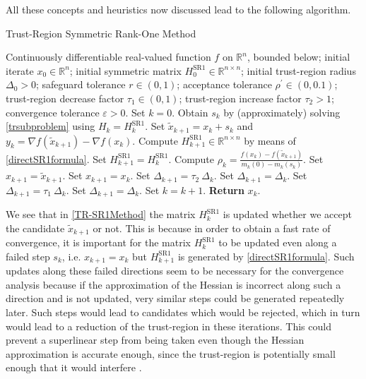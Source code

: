 All these concepts and heuristics now discussed lead to the following algorithm.
\begin{algorithm}[H]
    \caption{Trust-Region Symmetric Rank-One Method}\label{TR-SR1Method}
    \begin{algorithmic}[1]
        \State Continuously differentiable real-valued function $f$ on $\mathbb{R}^n$, bounded below; initial iterate $x_0 \in \mathbb{R}^n$; initial symmetric matrix $H^{\mathrm{SR1}}_0 \in \mathbb{R}^{n \times n}$; initial trust-region radius $\Delta_0 > 0$; safeguard tolerance $r \in (0,1)$; acceptance tolerance $\rho^{\prime} \in (0, 0.1)$; trust-region decrease factor $\tau_1 \in (0,1)$; trust-region increase factor $\tau_2 > 1$; convergence tolerance $\varepsilon > 0$. Set $k = 0$.
            \State Obtain $s_k$ by (approximately) solving \cref{trsubproblem} using $H_k = H^{\mathrm{SR1}}_k$.
            \State Set $\widetilde{x}_{k+1} = x_k + s_k$ and $y_k = \nabla f(\widetilde{x}_{k+1}) - \nabla f(x_k)$.
                \State Compute $H^{\mathrm{SR1}}_{k+1} \in \mathbb{R}^{n \times n}$ by means of \cref{directSR1formula}. 
			\Else 
				\State Set $H^{\mathrm{SR1}}_{k+1} = H^{\mathrm{SR1}}_k$.
            \EndIf 
            \State Compute $\rho_k = \frac{f(x_k) - f(\widetilde{x}_{k+1})}{m_k(0) - m_k(s_k)}$.
                \State Set $x_{k+1} = \widetilde{x}_{k+1}$.
			\Else 
				\State Set $x_{k+1} = x_k$.
            \EndIf 
                    \State Set $\Delta_{k+1} = \tau_2 \ \Delta_k$.
                \Else 
                    \State Set $\Delta_{k+1} = \Delta_k$.
                \EndIf 
			\Else 
                    \State Set $\Delta_{k+1} = \tau_1 \ \Delta_k$.
                \Else 
                    \State Set $\Delta_{k+1} = \Delta_k$.
                \EndIf 
            \EndIf 
            \State Set $k = k+1$.
        \EndWhile
        \State \textbf{Return} $x_k$.
    \end{algorithmic}
\end{algorithm}
We see that in \cref{TR-SR1Method} the matrix $H^{\mathrm{SR1}}_k$ is updated whether we accept the candidate $\widetilde{x}_{k+1}$ or not. This is because in order to obtain a fast rate of convergence, it is important for the matrix $H^{\mathrm{SR1}}_k$ to be updated even along a failed step $s_k$, i.e. $x_{k+1} = x_k$ but $H^{\mathrm{SR1}}_{k+1}$ is generated by \cref{directSR1formula}. Such updates along these failed directions seem to be necessary for the convergence analysis because if the approximation of the Hessian is incorrect along such a direction and is not updated, very similar steps could be generated repeatedly later. Such steps would lead to candidates which would be rejected, which in turn would lead to a reduction of the trust-region in these iterations. This could prevent a superlinear step from being taken even though the Hessian approximation is accurate enough, since the trust-region is potentially small enough that it would interfere \cite[p.~1028]{ByrdKhalfanSchnabel:1996}. \\
